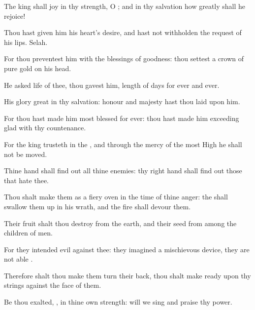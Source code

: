 {\Q {}The
king shall
joy in thy
strength, O
{}; and in thy
salvation how
greatly shall he
rejoice!


\par }{\Q {}Thou hast
given him his
heart’s
desire, and hast not
withholden the
request of his
lips.
Selah.


\par }{\Q {}For thou
preventest him with the
blessings of
goodness: thou
settest a
crown of pure
gold on his
head.


\par }{\Q {}He
asked
life of thee,
{} thou
gavest
{} him,
{}
length of
days for
ever and
ever.


\par }{\Q {}His
glory
{}
great in thy
salvation:
honour and
majesty hast thou
laid upon him.


\par }{\Q {}For thou hast
made him most
blessed for
ever: thou hast
made him exceeding
glad with thy
countenance.


\par }{\BB \par }
{\Q {}For the
king
trusteth in the
{}, and through the
mercy of the most
High he shall not be
moved.


\par }{\Q {}Thine
hand shall find
out all thine
enemies: thy right
hand shall find
out those that
hate thee.


\par }{\Q {}Thou shalt
make them as a
fiery
oven in the
time of thine
anger: the
{} shall swallow them
up in his
wrath, and the
fire shall
devour them.


\par }{\Q {}Their
fruit shalt thou
destroy from the
earth, and their
seed from among the
children of
men.


\par }{\Q {}For they
intended
evil against thee: they
imagined a mischievous
device,
{} they are not
able
{}.


\par }{\Q {}Therefore shalt thou
make them turn their
back,
{} thou shalt make
ready
{} upon thy
strings against the
face of them.


\par }{\Q {}Be thou
exalted,
{}, in thine own
strength:
{} will we
sing and
praise thy
power.




\par }
